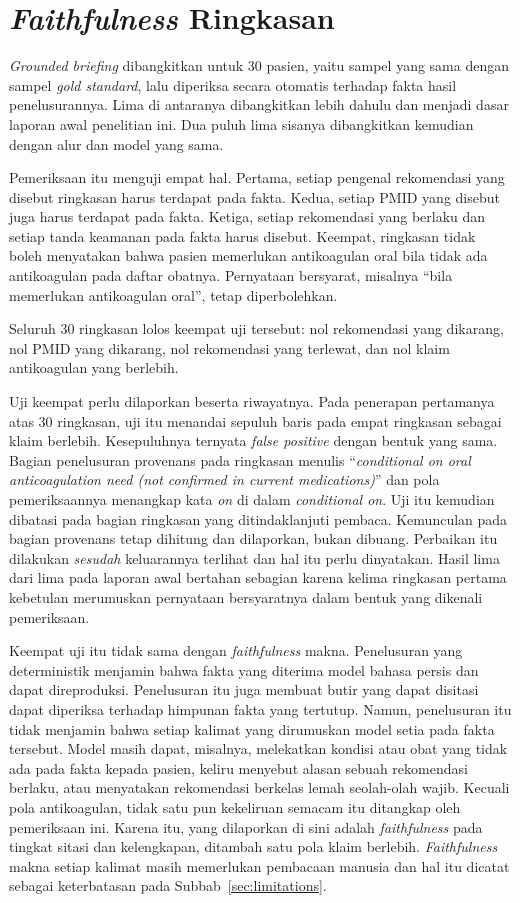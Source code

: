 \section{\emph{Faithfulness} Ringkasan}
\label{sec:faithfulness}

\emph{Grounded briefing} dibangkitkan untuk 30 pasien, yaitu sampel yang sama dengan sampel
\emph{gold standard}, lalu diperiksa secara otomatis terhadap fakta hasil penelusurannya.
Lima di antaranya dibangkitkan lebih dahulu dan menjadi dasar laporan awal penelitian ini.
Dua puluh lima sisanya dibangkitkan kemudian dengan alur dan model yang sama.

Pemeriksaan itu menguji empat hal. Pertama, setiap pengenal rekomendasi yang disebut
ringkasan harus terdapat pada fakta. Kedua, setiap PMID yang disebut juga harus terdapat pada
fakta. Ketiga, setiap rekomendasi yang berlaku dan setiap tanda keamanan pada fakta harus
disebut. Keempat, ringkasan tidak boleh menyatakan bahwa pasien memerlukan antikoagulan oral
bila tidak ada antikoagulan pada daftar obatnya. Pernyataan bersyarat, misalnya ``bila
memerlukan antikoagulan oral'', tetap diperbolehkan.

Seluruh 30 ringkasan lolos keempat uji tersebut: nol rekomendasi yang dikarang, nol PMID
yang dikarang, nol rekomendasi yang terlewat, dan nol klaim antikoagulan yang berlebih.

Uji keempat perlu dilaporkan beserta riwayatnya. Pada penerapan pertamanya atas 30
ringkasan, uji itu menandai sepuluh baris pada empat ringkasan sebagai klaim berlebih. Kesepuluhnya
ternyata \emph{false positive} dengan bentuk yang sama. Bagian penelusuran provenans pada
ringkasan menulis ``\emph{conditional on oral anticoagulation need (not confirmed in current
medications)}'' dan pola pemeriksaannya menangkap kata \emph{on} di dalam
\emph{conditional on}. Uji itu kemudian dibatasi pada bagian ringkasan yang ditindaklanjuti
pembaca. Kemunculan pada bagian provenans tetap dihitung dan dilaporkan, bukan dibuang.
Perbaikan itu dilakukan \emph{sesudah} keluarannya terlihat dan hal itu perlu dinyatakan.
Hasil lima dari lima pada laporan awal bertahan sebagian karena kelima ringkasan pertama
kebetulan merumuskan pernyataan bersyaratnya dalam bentuk yang dikenali pemeriksaan.

Keempat uji itu tidak sama dengan \emph{faithfulness} makna. Penelusuran yang deterministik
menjamin bahwa fakta yang diterima model bahasa persis dan dapat direproduksi. Penelusuran itu
juga membuat butir yang dapat disitasi dapat diperiksa terhadap himpunan fakta yang tertutup.
Namun, penelusuran itu tidak menjamin bahwa setiap kalimat yang dirumuskan model setia pada
fakta tersebut. Model masih dapat, misalnya, melekatkan kondisi atau obat yang tidak ada pada
fakta kepada pasien, keliru menyebut alasan sebuah rekomendasi berlaku, atau menyatakan
rekomendasi berkelas lemah seolah-olah wajib. Kecuali pola antikoagulan, tidak satu pun
kekeliruan semacam itu ditangkap oleh pemeriksaan ini. Karena itu, yang dilaporkan di sini
adalah \emph{faithfulness} pada tingkat sitasi dan kelengkapan, ditambah satu pola klaim
berlebih. \emph{Faithfulness} makna setiap kalimat masih memerlukan pembacaan manusia dan hal
itu dicatat sebagai keterbatasan pada Subbab~\ref{sec:limitations}.

